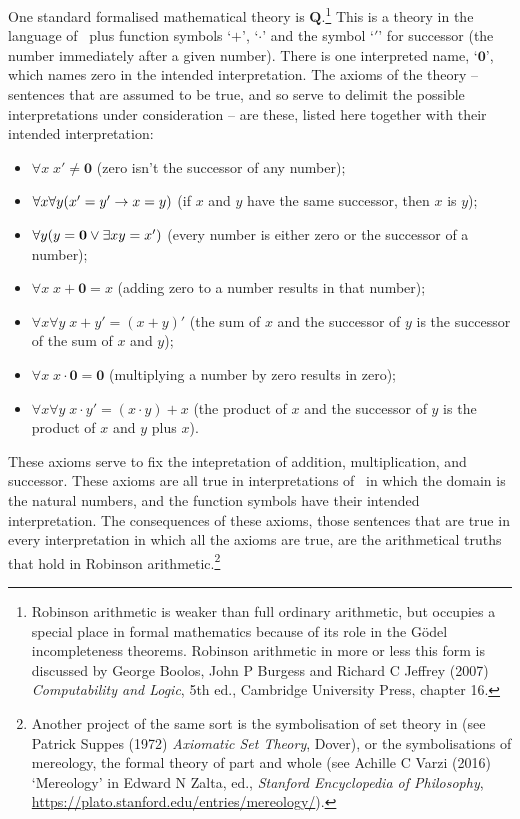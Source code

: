 One standard formalised mathematical theory is  $\mathbf{Q}$.\footnote{Robinson arithmetic is weaker than full ordinary arithmetic, but occupies a special place in formal mathematics because of its role in the Gödel incompleteness theorems. Robinson arithmetic in more or less this form is discussed by George Boolos, John P Burgess and Richard C Jeffrey (2007) \emph{Computability and Logic}, 5th ed., Cambridge University Press, chapter 16.} This is a theory in the language of \FOL\ plus function symbols `$+$', `$\cdot$' and the symbol `$'$' for successor (the number immediately after a given number). There is one interpreted name, `$\mathbf{0}$', which names zero in the intended interpretation.
The axioms of the theory – sentences that are assumed to be true, and so serve to delimit the possible interpretations under consideration – are these, listed here together with their intended interpretation:
\begin{itemize}
	\item $\forall x\; x' \neq \mathbf{0}$ (zero isn't the successor of any number);
	\item $\forall x \forall y (x' = y' \rightarrow x = y)$ (if $x$ and $y$ have the same successor, then $x$ is $y$);
	\item $\forall y (y = \mathbf{0} \vee \exists x y = x')$ (every number is either zero or the successor of a number);
	\item $\forall x\; x + \mathbf{0} = x$ (adding zero to a number results in that number);
	\item $\forall x \forall y\; x + y' = (x + y)'$ (the sum of $x$ and the successor of $y$ is the successor of the sum of $x$ and $y$);
	\item $\forall x\; x\cdot\mathbf{0} = \mathbf{0}$ (multiplying a number by zero results in zero);
	\item $\forall x \forall y\; x\cdot y' = (x\cdot y) + x$ (the product of $x$ and the successor of $y$ is the product of $x$ and $y$ plus $x$).
\end{itemize} These axioms serve to fix the intepretation of addition, multiplication, and successor. These axioms are all true in interpretations of \FOL\ in which the domain is the natural numbers, and the function symbols have their intended interpretation. The consequences of these axioms, those sentences that are true in every interpretation in which all the axioms are true, are the arithmetical truths that hold in Robinson arithmetic.\footnote{Another project of the same sort is the symbolisation of set theory in \FOL (see Patrick Suppes (1972) \emph{Axiomatic Set Theory}, Dover), or the symbolisations of mereology, the formal theory of part and whole (see Achille C Varzi (2016) `Mereology' in Edward N Zalta, ed., \emph{Stanford Encyclopedia of Philosophy}, \url{https://plato.stanford.edu/entries/mereology/}).}

